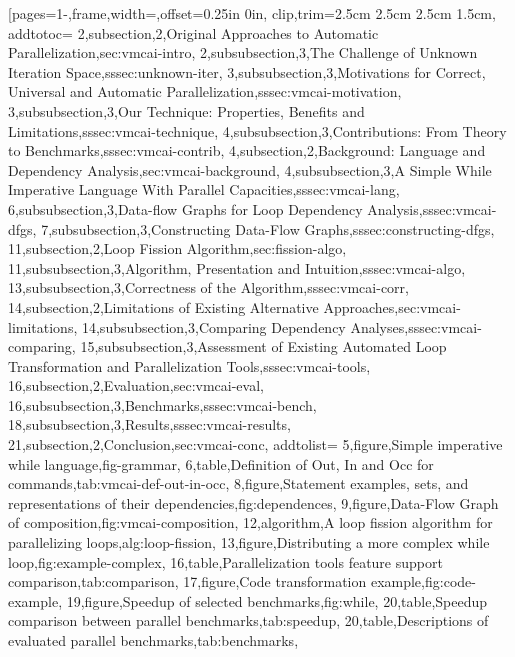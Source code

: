 [pages={1-},frame,width={\textwidth},offset=0.25in 0in, clip,trim=2.5cm 2.5cm 2.5cm 1.5cm,
    addtotoc={
        2,subsection,2,{Original Approaches to Automatic Parallelization},sec:vmcai-intro,
        2,subsubsection,3,{The Challenge of Unknown Iteration Space},sssec:unknown-iter,
        3,subsubsection,3,{Motivations for Correct, Universal and Automatic Parallelization},sssec:vmcai-motivation,
        3,subsubsection,3,{Our Technique: Properties, Benefits and Limitations},sssec:vmcai-technique,
        4,subsubsection,3,{Contributions: From Theory to Benchmarks},sssec:vmcai-contrib,
        4,subsection,2,{Background: Language and Dependency Analysis},sec:vmcai-background,
        4,subsubsection,3,{A Simple While Imperative Language With Parallel Capacities},sssec:vmcai-lang,
        6,subsubsection,3,{Data-flow Graphs for Loop Dependency Analysis},sssec:vmcai-dfgs,
        7,subsubsection,3,{Constructing Data-Flow Graphs},sssec:constructing-dfgs,
        11,subsection,2,{Loop Fission Algorithm},sec:fission-algo,
        11,subsubsection,3,{Algorithm, Presentation and Intuition},sssec:vmcai-algo,
        13,subsubsection,3,{Correctness of the Algorithm},sssec:vmcai-corr,
        14,subsection,2,{Limitations of Existing Alternative Approaches},sec:vmcai-limitations,
        14,subsubsection,3,{Comparing Dependency Analyses},sssec:vmcai-comparing,
        15,subsubsection,3,{Assessment of Existing Automated Loop Transformation and Parallelization Tools},sssec:vmcai-tools,
        16,subsection,2,{Evaluation},sec:vmcai-eval,
        16,subsubsection,3,{Benchmarks},sssec:vmcai-bench,
        18,subsubsection,3,{Results},sssec:vmcai-results,
        21,subsection,2,{Conclusion},sec:vmcai-conc},
    addtolist={
        5,figure,{Simple imperative while language},fig-grammar,
        6,table,{Definition of Out, In and Occ for commands},tab:vmcai-def-out-in-occ,
        8,figure,{Statement examples, sets, and representations of their dependencies},fig:dependences,
        9,figure,{Data-Flow Graph of composition},fig:vmcai-composition,
        12,algorithm,{A loop fission algorithm for parallelizing loops},alg:loop-fission,
        13,figure,{Distributing a more complex while loop},fig:example-complex,
        16,table,{Parallelization tools feature support comparison},tab:comparison,
        17,figure,{Code transformation example},fig:code-example,
        19,figure,{Speedup of selected benchmarks},fig:while,
        20,table,{Speedup comparison between parallel benchmarks},tab:speedup,
        20,table,{Descriptions of evaluated parallel benchmarks},tab:benchmarks},

